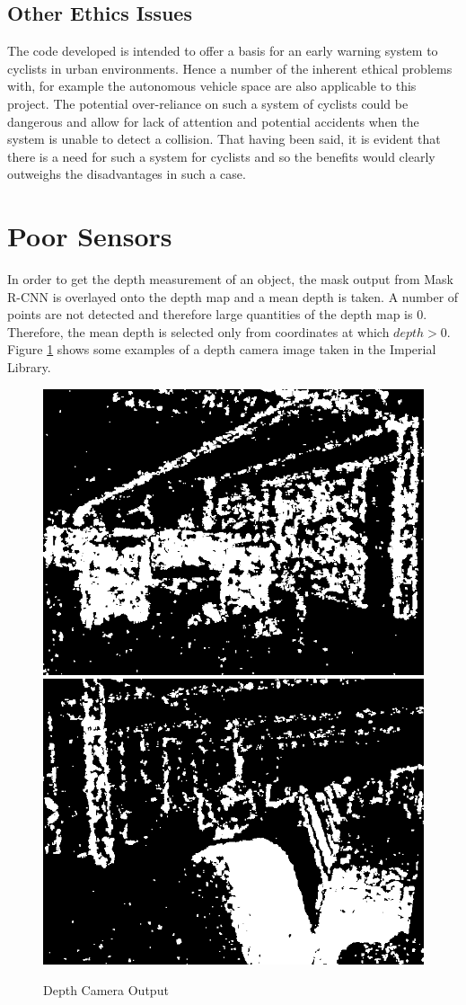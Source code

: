 \documentclass[a4paper,11pt,notitlepage]{article}
\begin{document}
\subsection{Other Ethics Issues}

The code developed is intended to offer a basis for an early warning system to cyclists in urban environments. Hence a number of the inherent ethical problems with, for example the autonomous vehicle space are also applicable to this project. The potential over-reliance on such a system of cyclists could be dangerous and allow for lack of attention and potential accidents when the system is unable to detect a collision. That having been said, it is evident that there is a need for such a system for cyclists and so the benefits would clearly outweighs the disadvantages in such a case.

\section{Poor Sensors}

In order to get the depth measurement of an object, the mask output from Mask R-CNN is overlayed onto the depth map and a mean depth is taken. A number of points are not detected and therefore large quantities of the depth map is 0. Therefore, the mean depth is selected only from coordinates at which $depth>0$. Figure \ref{DCO} shows some examples of a depth camera image taken in the Imperial Library.

\noindent \begin{figure}[h!]
	\includegraphics[width = 0.5\hsize]{figures/depth_image_1.png}
	\includegraphics[width = 0.5\hsize]{figures/depth_image_2.png}
	\caption{Depth Camera Output}
	\label{DCO}
\end{figure}
\end{document}
